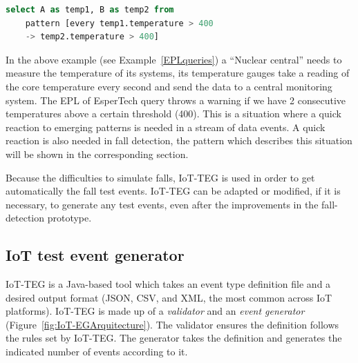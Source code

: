 \documentclass[conference]{IEEEtran}
\theoremstyle{definition}
\begin{document}
 \renewcommand{\lstlistingname}{Example}
 
 \begin{lstlisting}[basicstyle=\ttfamily\footnotesize,language=SQL,caption=EPL of EsperTech query example,label=EPLqueries]
  select A as temp1, B as temp2 from 
    pattern [every temp1.temperature > 400 
    -> temp2.temperature > 400]
 \end{lstlisting}
 
In the above example (see Example~\ref{EPLqueries}) a ``Nuclear central'' needs to measure the temperature
of its systems, its temperature gauges take a reading of the core temperature every second and send the data 
to a central monitoring system. The EPL of EsperTech query throws a warning if we have 2 consecutive 
temperatures above a certain threshold (400). This is a situation where a quick reaction to emerging patterns 
is needed in a stream of data events. A quick reaction is also needed in fall detection, the pattern which 
describes this situation will be shown in the corresponding section.
 
Because the difficulties to simulate falls, IoT-TEG is used in order to get automatically the fall test events. 
IoT-TEG can be adapted or modified, if it is necessary, to generate any test events, even after the improvements 
in the fall-detection prototype.

\subsection{IoT test event generator}
\label{iotteg}

IoT-TEG is a Java-based tool which takes an event type definition file and a desired output
format (JSON, CSV, and XML, the most common across IoT platforms). IoT-TEG is made up of a
\emph{validator} and an \emph{event generator} (Figure~\ref{fig:IoT-EGArquitecture}). The
validator ensures the definition follows the rules set by IoT-TEG. The generator takes the
definition and generates the indicated number of events according to it.
\end{document}
